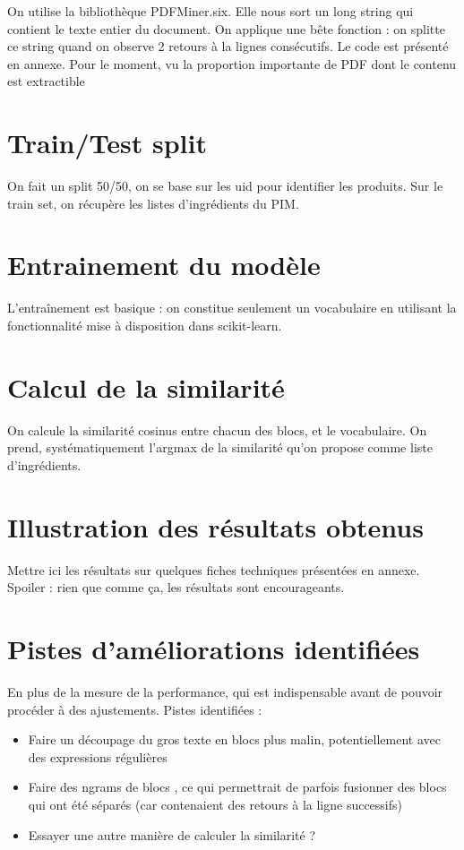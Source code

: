        On utilise la bibliothèque PDFMiner.six. 
        Elle nous sort un long string qui contient le texte entier du document.
        On applique une \og bête \fg fonction : on splitte ce string quand on observe 2 retours à la lignes consécutifs.
        Le code est présenté en annexe.
        Pour le moment, vu la proportion importante de PDF dont le contenu est extractible

        \section{Train/Test split}

        On fait un split 50/50, on se base sur les uid pour identifier les produits.
        Sur le train set, on récupère les listes d'ingrédients du PIM.

        \section{Entrainement du modèle}

        L'entraînement est basique : on constitue seulement un vocabulaire en utilisant la fonctionnalité mise à disposition dans scikit-learn.

        \section{Calcul de la similarité}

        On calcule la similarité cosinus entre chacun des blocs, et le vocabulaire.
        On prend, systématiquement l'argmax de la similarité qu'on propose comme liste d'ingrédients.

        \section{Illustration des résultats obtenus}
    
        Mettre ici les résultats sur quelques fiches techniques présentées en annexe.
        Spoiler : rien que comme ça, les résultats sont encourageants.

        \section{Pistes d'améliorations identifiées}

        En plus de la mesure de la performance, qui est indispensable avant de pouvoir procéder à des ajustements.
        Pistes identifiées : 
        \begin{itemize}
            \item Faire un découpage du gros texte en blocs plus malin, potentiellement avec des expressions régulières
            \item Faire des \og ngrams de blocs \og, ce qui permettrait de parfois fusionner des blocs qui ont été séparés (car contenaient des retours à la ligne successifs)
            \item Essayer une autre manière de calculer la similarité ?
        \end{itemize}

